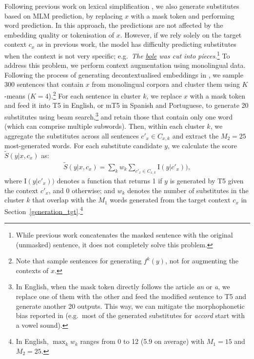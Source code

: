 \documentclass[11pt]{article}
\newcommand{\secref}[2][]{Section#1~\ref{#2}\xspace}
\newcommand{\ex}[1]{\textit{#1}\xspace}
\begin{document}
Following previous work on lexical simplification \cite{li-etal-2022-mantis,qiang2020BERTLS,DBLP:journals/corr/abs-2006-14939}, we also generate substitutes based on MLM prediction, by replacing $x$ with a mask token and performing word prediction. In this approach, the predictions are not affected by the embedding quality or tokenisation of $x$. However, if we rely solely on the target context $c_x$ as in previous work, the model has difficulty predicting substitutes when the context is not very specific; e.g.\ \ex{The \underline{bole} was cut into pieces}.\footnote{While previous work concatenates the masked sentence with the original (unmasked) sentence, it does not completely solve this problem.} To address this problem, we perform context augmentation using monolingual data. Following the process of generating decontextualised embeddings in \citet{wada-etal-2022-unsupervised}, we sample 300 sentences that contain $x$ from monolingual corpora and cluster them using $K$-means ($K=4$).\footnote{Note that \citet{wada-etal-2022-unsupervised} sample sentences for generating $f^{k}(y)$, not for augmenting the contexts of $x$.} For each sentence in cluster $k$, we replace $x$ with a mask token and feed it into T5 \cite{t5} in English, or mT5 \cite{mt5} in Spanish and Portuguese, to generate 20 substitutes using beam search,\footnote{In English, when the mask token directly follows the article \ex{an} or \ex{a}, we replace one of them with the other and feed the modified sentence to T5 and generate another 20 outputs. This way, we can mitigate the morphophonetic bias reported in \citet{wada-etal-2022-unsupervised} (e.g.\ most of the generated substitutes for \ex{accord} start with a vowel sound).}  and retain those that contain only one word (which can comprise multiple subwords). Then, within each cluster $k$, we aggregate the substitutes across all sentences $c'_x \in C_{x,k}$ and extract the $M_2=25$ most-generated words. For each substitute candidate $y$, we calculate the score ${\tilde{S}}(y|x, c_x)$ as:
\begin{gather}
\tilde{S}(y|x, c_x)=\sum_{k}w_{k} \sum_{c'_x \in C_{x,k}}{\mathrm{I}(y|c'_x))},\label{t5_score}
\end{gather}
where ${\mathrm{I}(y|c'_x))}$ denotes a function that returns 1 if $y$ is generated by T5 given the context $c'_x$, and 0 otherwise; and $w_k$ denotes the number of substitutes in the cluster $k$ that overlap with the $M_1$ words generated from the target context $c_x$ in \secref[]{generation_tgt}.\footnote{In English, $\max_{k} w_k$ ranges from 0 to 12 (5.9 on average) with $M_1 = 15$ and $M_2 = 25$.}
\end{document}
